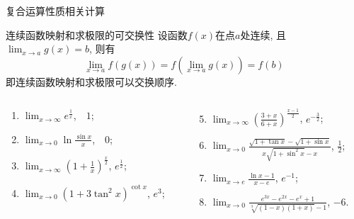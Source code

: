 \documentclass[
10pt,
aspectratio=43,
]{beamer}
\begin{document}
\begin{frame}{复合运算性质相关计算}
	\begin{block}{连续函数映射和求极限的可交换性}
		设函数$f(x)$在点$a$处连续, 且$\lim_{x\to a}g(x)=b$, 则有
		\[\lim_{x\to a}f(g(x))=f(\lim_{x\to a}g(x))=f(b)\]
		即连续函数映射和求极限可以交换顺序.
	\end{block}
	\pause
	\begin{block}{}
		\begin{columns}[onlytextwidth]
			\begin{column}{0.3\textwidth}
				\begin{enumerate}
					\item $\displaystyle \lim _{x \rightarrow \infty} e^{\frac{1}{x}}$, \pause\,\, $1$;\pause
					\item $\displaystyle \lim _{x \rightarrow 0} \ln \frac{\sin x}{x}$, \pause\,\, $0$;\pause
					\item $\displaystyle \lim _{x \rightarrow \infty}\left(1+\frac{1}{x}\right)^{\frac{x}{2}}$,\pause  \,\,$e^\frac{1}{2}$;\pause
					\item $\displaystyle \lim _{x \rightarrow 0}\left(1+3 \tan ^2 x\right)^{\cot x}$,\pause\,\,$e^3$;\pause
				\end{enumerate}
			\end{column}
			\begin{column}{0.55\textwidth}
				\begin{enumerate}
					\setcounter{enumi}{4}
					\item $\displaystyle \lim _{x \rightarrow \infty}\left(\frac{3+x}{6+x}\right)^{\frac{x-1}{2}}$,\,\,\pause $e^{-\frac{3}{2}}$;\pause
					\item $\displaystyle \lim _{x \rightarrow 0} \frac{\sqrt{1+\tan x}-\sqrt{1+\sin x}}{x \sqrt{1+\sin ^2 x}-x}$,\,\,\pause $\displaystyle\frac{1}{2}$;\pause
					\item $\displaystyle \lim _{x \rightarrow e} \frac{\ln x-1}{x-e}$,\,\,\pause $e^{-1}$;\pause
					\item $\displaystyle \lim _{x \rightarrow 0} \frac{e^{3 x}-e^{2 x}-e^x+1}{\sqrt[3]{(1-x)(1+x)}-1}$,\,\,\pause $-6$.
				\end{enumerate}
			\end{column}
		\end{columns}
	\end{block}
\end{frame}
\end{document}
